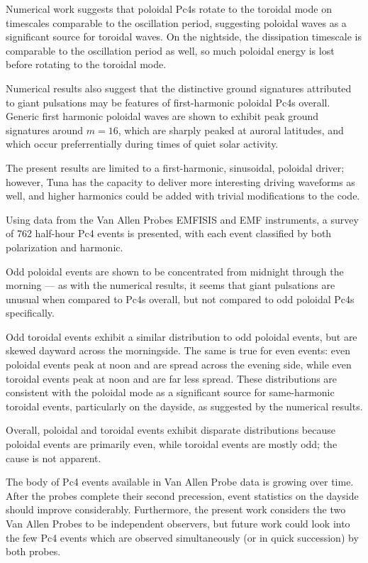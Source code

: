 \documentclass{article}
\newcommand{\azm}{\ensuremath{m}\xspace}
\begin{document}
Numerical work suggests that poloidal Pc4s rotate to the toroidal mode on timescales comparable to the oscillation period, suggesting poloidal waves as a significant source for toroidal waves. On the nightside, the dissipation timescale is comparable to the oscillation period as well, so much poloidal energy is lost before rotating to the toroidal mode.

Numerical results also suggest that the distinctive ground signatures attributed to giant pulsations may be features of first-harmonic poloidal Pc4s overall. Generic first harmonic poloidal waves are shown to exhibit peak ground signatures around ${\azm = 16}$, which are sharply peaked at auroral latitudes, and which occur preferrentially during times of quiet solar activity.

The present results are limited to a first-harmonic, sinusoidal, poloidal driver; however, Tuna has the capacity to deliver more interesting driving waveforms as well, and higher harmonics could be added with trivial modifications to the code.


Using data from the Van Allen Probes EMFISIS and EMF instruments, a survey of 762 half-hour Pc4 events is presented, with each event classified by both polarization and harmonic.

Odd poloidal events are shown to be concentrated from midnight through the morning --- as with the numerical results, it seems that giant pulsations are unusual when compared to Pc4s overall, but not compared to odd poloidal Pc4s specifically.

Odd toroidal events exhibit a similar distribution to odd poloidal events, but are skewed dayward across the morningside. The same is true for even events: even poloidal events peak at noon and are spread across the evening side, while even toroidal events peak at noon and are far less spread. These distributions are consistent with the poloidal mode as a significant source for same-harmonic toroidal events, particularly on the dayside, as suggested by the numerical results.

Overall, poloidal and toroidal events exhibit disparate distributions because poloidal events are primarily even, while toroidal events are mostly odd; the cause is not apparent.

The body of Pc4 events available in Van Allen Probe data is growing over time. After the probes complete their second precession, event statistics on the dayside should improve considerably. Furthermore, the present work considers the two Van Allen Probes to be independent observers, but future work could look into the few Pc4 events which are observed simultaneously (or in quick succession) by both probes.
\end{document}
